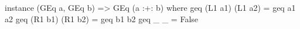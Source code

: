 \begin{code}
instance (GEq a, GEq b) => GEq (a :+: b) where
  geq (L1 a1) (L1 a2) = geq a1 a2
  geq (R1 b1) (R1 b2) = geq b1 b2
  geq _ _             = False
\end{code}
